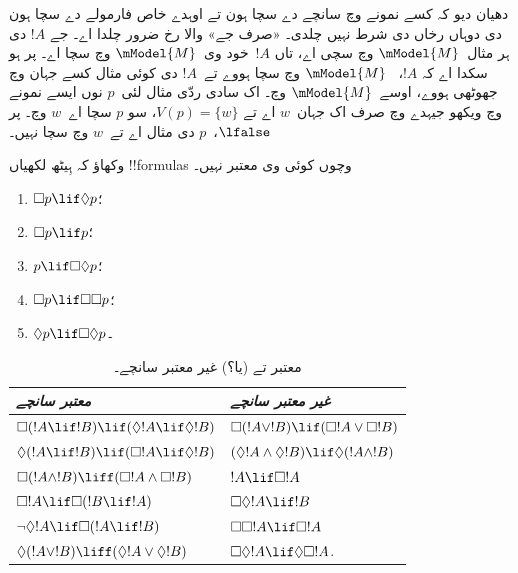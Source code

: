 \documentclass[../../../include/open-logic-section]{subfiles}
\begin{document}
دھیان دیو کہ کسے نمونے وچ سانچے دے سچا ہون تے اوہدے خاص فارمولے دے سچا ہون دی دوہاں رخاں دی شرط نہیں چلدی۔ «صرف جے» والا رخ ضرور چلدا اے۔ جے $!A$ دی ہر مثال~$\mModel{M}$ وچ سچی اے، تاں
$!A$~خود وی~$\mModel{M}$ وچ سچا اے۔ پر ہو سکدا اے کہ $!A$،
~$\mModel{M}$ وچ سچا ہووے تے~$!A$ دی کوئی مثال کسے جہان وچ جھوٹھی ہووے، اوسے~$\mModel{M}$ وچ۔ اک سادی ردّی مثال لئی~$p$ نوں ایسے نمونے وچ ویکھو جیہدے وچ صرف اک جہان~$w$ اے تے $V(p) = \{w\}$، سو $p$ سچا اے~$w$ وچ۔ پر $\lfalse$،~$p$ دی مثال اے تے~$w$ وچ سچا نہیں۔

\begin{prob}
  وکھاؤ کہ ہِیٹھ لکھیاں !!{formula}s وچوں کوئی وی معتبر نہیں۔
  \begin{enumerate}
    \item[\Ax{D}:] \quad $\Box p \lif \Diamond p$؛
    \item[\Ax{T}:] \quad $\Box p \lif p$؛
    \item[\Ax{B}:] \quad $p \lif \Box\Diamond p$؛
    \item[\Ax{4}:] \quad $\Box p \lif \Box \Box p$؛
    \item[\Ax{5}:] \quad $\Diamond p \lif \Box \Diamond
      p$۔
  \end{enumerate}
\end{prob}

\begin{table}[t]
    \centering
    \begin{tabular}{| l || l |}
      \hline
      {\emph{معتبر سانچے}} & {\emph{غیر معتبر سانچے}} \\
      \hline\hline
      $\Box(!A \lif !B) \lif (\Diamond !A \lif \Diamond !B)$
      & $\Box (!A \lor !B) \lif (\Box !A \lor \Box !B)$ \\
      $\Diamond (!A \lif !B) \lif (\Box !A \lif \Diamond
      !B)$
      & $(\Diamond !A \land \Diamond !B) \lif \Diamond (!A
      \land !B)$\\
      $\Box (!A \land !B) \liff (\Box !A \land \Box !B)$
      & $!A \lif \Box !A$ \\
      $\Box !A \lif \Box (!B \lif !A)$
      & $\Box \Diamond !A \lif !B$ \\
      $\lnot \Diamond !A \lif \Box (!A \lif !B)$
      & $\Box \Box !A \lif \Box !A$ \\
      $\Diamond (!A \lor !B) \liff (\Diamond !A \lor
      \Diamond !B)$
      & $\Box \Diamond !A \lif \Diamond \Box !A$. \\
      \hline
    \end{tabular}
    \caption{معتبر تے (یا؟) غیر معتبر سانچے۔}
\end{table}
\end{document}
